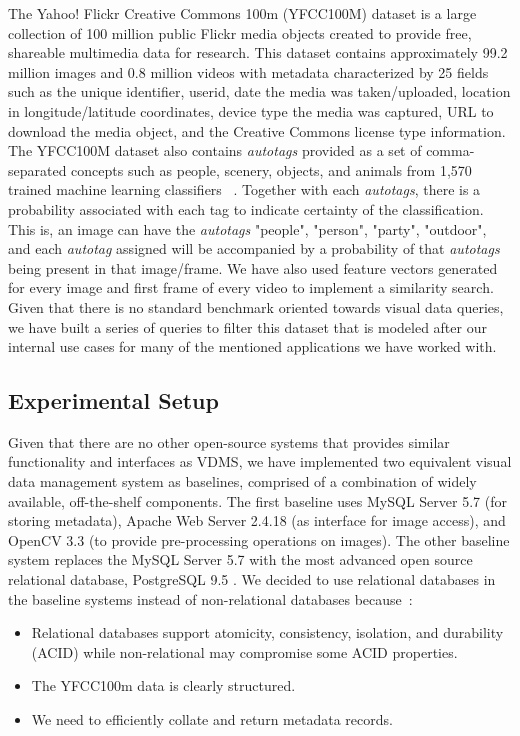 The Yahoo! Flickr Creative Commons 100m (YFCC100M) dataset is a large
collection of 100 million public Flickr media objects created to provide free,
shareable multimedia data for research.
This dataset contains approximately 99.2 million images and 0.8 million videos
with metadata characterized by 25 fields such as the unique identifier, userid,
date the media was taken/uploaded, location in longitude/latitude coordinates,
device type the media was captured, URL to download the media object,
and the Creative Commons license type information.
The YFCC100M dataset also contains \textit{autotags}
provided as a set of comma-separated concepts such as people, scenery, objects,
and animals from 1,570 trained machine learning classifiers ~\cite{Thomee_2016}.
Together with each \textit{autotags}, there is a probability associated with
each tag to indicate certainty of the classification.
This is, an image can have the \textit{autotags} "people", "person", "party",
"outdoor", and each \textit{autotag} assigned will be accompanied by a
probability of that \textit{autotags} being present in that image/frame.
We have also used feature vectors generated for every image and first frame
of every video \cite{features} to implement a similarity search.
Given that there is no standard benchmark oriented towards visual data queries,
we have built a series of queries to filter this dataset that is modeled after
our internal use cases for many of the mentioned applications we have worked
with.

\subsection{Experimental Setup}
\label{setup}

Given that there are no other open-source systems that provides similar
functionality and interfaces as VDMS, we have implemented two equivalent
visual data management system as baselines, comprised of a combination of
widely available, off-the-shelf components.
The first baseline uses MySQL Server 5.7 (for storing metadata),
Apache Web Server 2.4.18 (as interface for image access), and
OpenCV 3.3 (to provide pre-processing operations on images).
The other baseline system replaces the MySQL Server 5.7 with the
most advanced open source relational database, PostgreSQL 9.5 \cite{postgresql}.
We decided to use relational databases in the baseline systems instead of
non-relational databases because~\cite{Jatana2012, li_2019}:

\begin{itemize}
    \item Relational databases support atomicity, consistency, isolation,
    and durability (ACID) while non-relational may compromise some ACID properties.
    \item The YFCC100m data is clearly structured.
    \item We need to efficiently collate and return metadata records.
\end{itemize}

